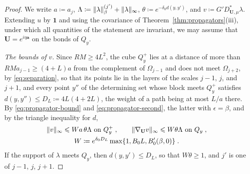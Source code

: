 \documentclass[11pt]{preprint}
\newcommand{\id}{\mathbf 1}
\DeclarePairedDelimiter{\norm}{\lVert}{\rVert}
\numberwithin{equation}{section}
\begin{document}
\begin{proof}
We write $a \coloneqq a_j$, $\Lambda \coloneqq \norm\lambda^{(j')}_\beta + \norm\lambda_\infty$, $\theta \coloneqq e^{-\delta_0d(y, y')}$, and $v \coloneqq G'D^*_{\mathbf U,\mu}\lambda$. Extending $u$ by $\id$ and using the covariance of Theorem~\ref{thm:propagators}(iii), under which all quantities of the statement are invariant, we may assume that $\mathbf U = e^{i\eta\mathbf a}$ on the bonds of $Q_y$.

\emph{The bounds of $v$.} Since $RM \geqslant 4L^2$, the cube $Q^+_y$ lies at a distance of more than $RMa_{j-1} \geqslant (4 + L)a$ from the complement of $\Omega_{j-1}$ and does not meet $\Omega_{j+2}$, by \eqref{eq:separation}, so that its points lie in the layers of the scales $j - 1$, $j$, and $j + 1$, and every point $y''$ of the determining set whose block meets $Q^+_y$ satisfies $d(y, y'') \leqslant D_L \coloneqq 4L(4 + 2L)$, the weight of a path being at most $L/a$ there. By \eqref{eq:propagator-bound} and \eqref{eq:propagator-second}, the latter with $\epsilon = \beta$, and by the triangle inequality for $d$,
\begin{equation}\label{eq:schauder-input}
\begin{gathered}
    \norm v_\infty \leqslant Wa\,\theta\Lambda \text{ on } Q^+_y\;,
    \qquad
    \norm{\nabla_{\mathbf U}v}_\infty \leqslant W\theta\Lambda \text{ on } Q_y\;,\\
    W \coloneqq e^{\delta_0D_L}\max\{ 1, B_0L, B'_0(\beta, 0) \}\;.
\end{gathered}
\end{equation}
If the support of $\lambda$ meets $Q_y$, then $d(y, y') \leqslant D_L$, so that $W\theta \geqslant 1$, and $j'$ is one of $j - 1$, $j$, $j + 1$.


\end{proof}
\end{document}
